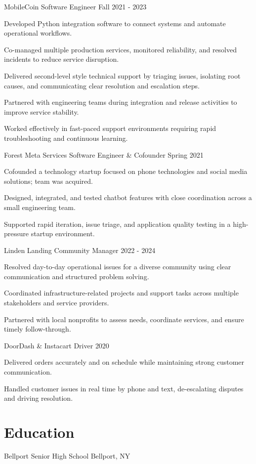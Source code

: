 \documentclass{../styles/resume}
\begin{document}
\subsectionpositiondate
    {MobileCoin}
    {Software Engineer}
    {Fall 2021 - 2023}
\resumesublistbegin
    \item Developed Python integration software to connect systems and automate operational workflows.
    \item Co-managed multiple production services, monitored reliability, and resolved incidents to reduce service disruption.
    \item Delivered second-level style technical support by triaging issues, isolating root causes, and communicating clear resolution and escalation steps.
    \item Partnered with engineering teams during integration and release activities to improve service stability.
    \item Worked effectively in fast-paced support environments requiring rapid troubleshooting and continuous learning.
\resumesublistend

\subsectionpositiondate
    {Forest Meta Services}
    {Software Engineer \& Cofounder}
    {Spring 2021}
\resumesublistbegin
    \item Cofounded a technology startup focused on phone technologies and social media solutions; team was acquired.
    \item Designed, integrated, and tested chatbot features with close coordination across a small engineering team.
    \item Supported rapid iteration, issue triage, and application quality testing in a high-pressure startup environment.
\resumesublistend

\subsectionpositiondate
    {Linden Landing}
    {Community Manager}
    {2022 - 2024}
\resumesublistbegin
    \item Resolved day-to-day operational issues for a diverse community using clear communication and structured problem solving.
    \item Coordinated infrastructure-related projects and support tasks across multiple stakeholders and service providers.
    \item Partnered with local nonprofits to assess needs, coordinate services, and ensure timely follow-through.
\resumesublistend

\subsectionpositiondate
    {DoorDash \& Instacart}
    {Driver}
    {2020}
\resumesublistbegin
    \item Delivered orders accurately and on schedule while maintaining strong customer communication.
    \item Handled customer issues in real time by phone and text, de-escalating disputes and driving resolution.
\resumesublistend

\section{Education}
\subsectionlocationdate
    {Bellport Senior High School}
    {Bellport, NY}
    {}
\end{document}
